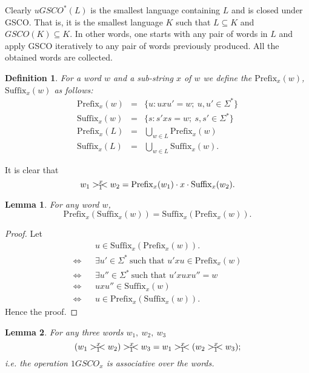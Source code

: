 \documentclass{llncs}
\newtheorem{defin}{Definition}
\newtheorem{lem}{Lemma}
\newcommand{\sg}{\Sigma}
\newcommand{\p}{\mathrm{Prefix}}
\newcommand{\s}{\mathrm{Suffix}}
\newcommand{\rs}{\hspace{-3.5mm}-\hspace{-2mm}<}
\begin{document}
\par Clearly $uGSCO^*(L)$ is the smallest language containing $L$ and is closed under GSCO. That is, it is the smallest language $K$ such that $L\subseteq K$ and $GSCO(K)\subseteq K$. In other words, one starts with any pair of words in $L$ and apply GSCO iteratively to any pair of words previously produced. All the obtained words are collected.

\begin{defin}
For a word $w$ and a sub-string $x$ of $w$ we define the $\p_x(w)$, $\s_x(w)$ as follows:
\begin{eqnarray*}
\p_x(w)&=&\{u:uxu'=w;~u,u'\in\sg^*\}\\
\s_x(w)&=&\{s:s'xs=w;~s,s'\in\sg^*\}\\
\p_x(L)&=&\bigcup_{w\in L}\p_x(w)\\
\s_x(L)&=&\bigcup_{w\in L}\s_x(w).
\end{eqnarray*}
\end{defin}
It is clear that
\[w_1>_1^x\rs w_2=\p_x(w_1)\cdot x\cdot\s_x(w_2).\]
\begin{lem}\label{its1}
For any word $w$,
\[\p_x(\s_x(w))=\s_x(\p_x(w)).\]
\end{lem}
\begin{proof}
Let
\begin{eqnarray*}
&&u\in\s_x(\p_x(w)).\\
\Leftrightarrow&&\exists u'\in \sg^*~\mbox{such that~}u'xu\in\p_x(w)\\
\Leftrightarrow&&\exists u''\in \sg^*~\mbox{such that~}u'xuxu''=w\\
\Leftrightarrow&&uxu''\in\s_x(w)\\
\Leftrightarrow&&u\in\p_x(\s_x(w)).
\end{eqnarray*}
Hence the proof.
\end{proof}
\begin{lem}\label{its2}
For any three words $w_1,~ w_2,~w_3$
\[ (w_1>_1^x\rs w_2)>_1^x\rs w_3=w_1>_1^x\rs (w_2>_1^x\rs w_3);\]
i.e. the operation $1GSCO_x$ is associative over the words.
\end{lem}
\end{document}

